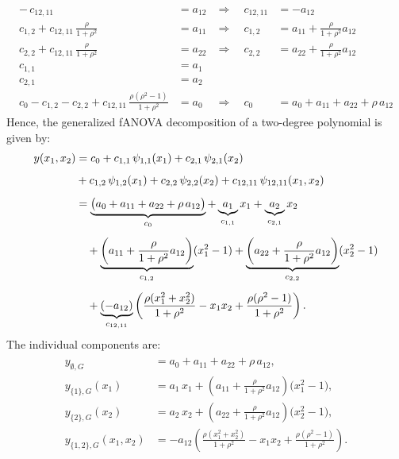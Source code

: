 \begin{align*}
-\,c_{12, 11} &= a_{12} &\Rightarrow\quad c_{12, 11} &= -a_{12} \\[0.5em]
c_{1,2} + c_{12, 11}\,\tfrac{\rho}{1+\rho^2} &= a_{11} 
&\Rightarrow\quad c_{1,2} &= a_{11} + \tfrac{\rho}{1+\rho^2}a_{12} \\[0.5em]
c_{2,2} + c_{12, 11}\,\tfrac{\rho}{1+\rho^2} &= a_{22} 
&\Rightarrow\quad c_{2,2} &= a_{22} + \tfrac{\rho}{1+\rho^2}a_{12} \\[0.5em]
c_{1,1} &= a_1 \\[0.5em]
c_{2,1} &= a_2 \\[0.5em]
c_0 - c_{1,2} - c_{2,2} + c_{12, 11}\,\tfrac{\rho(\rho^2 - 1)}{1+\rho^2} &= a_0 
&\Rightarrow\quad 
c_0 &= a_0 + a_{11} + a_{22} + \rho\,a_{12}
\end{align*}
Hence, the generalized fANOVA decomposition of a two-degree polynomial is given by:
\begin{align*}
y(x_1,x_2) 
&= c_0 
  + c_{1,1}\,\psi_{1,1}(x_1) 
  + c_{2,1}\,\psi_{2,1}(x_2) \\[0.5em]
&+ c_{1,2}\,\psi_{1,2}(x_1)
  + c_{2,2}\,\psi_{2,2}(x_2)
  + c_{12,11}\,\psi_{12,11}(x_1,x_2) \\[0.5em]
&= 
\underbrace{\big(a_0 + a_{11} + a_{22} + \rho\,a_{12}\big)}_{c_0} 
+ \underbrace{a_1}_{c_{1,1}} x_1
+ \underbrace{a_2}_{c_{2,1}} x_2 \\[0.5em]
&\quad 
+ \underbrace{\left(a_{11} + \frac{\rho}{1+\rho^2}a_{12}\right)}_{c_{1,2}} (x_1^2 - 1)
+ \underbrace{\left(a_{22} + \frac{\rho}{1+\rho^2}a_{12}\right)}_{c_{2,2}} (x_2^2 - 1) \notag \\[0.5em]
&\quad 
+ \underbrace{(-a_{12})}_{c_{12, 11}}\left(
    \frac{\rho(x_1^2+x_2^2)}{1+\rho^2} - x_1 x_2 
    + \frac{\rho(\rho^2-1)}{1+\rho^2}
  \right).
\end{align*}
The individual components are:
\begin{align}
\begin{split}
y_{\emptyset, G} &= a_0 + a_{11} + a_{22} + \rho\,a_{12}, \\[0.5em]
y_{\{1\}, G}(x_1) &= a_1\,x_1 
  + \left(a_{11} + \frac{\rho}{1+\rho^2}a_{12}\right)\bigl(x_1^2 - 1\bigr), \\[0.5em]
y_{\{2\}, G}(x_2) &= a_2\,x_2 
  + \left(a_{22} + \frac{\rho}{1+\rho^2}a_{12}\right)\bigl(x_2^2 - 1\bigr), \\[0.5em]
y_{\{1,2\}, G}(x_1,x_2) 
&= -a_{12}\!\left(
    \frac{\rho(x_1^2+x_2^2)}{1+\rho^2} 
    - x_1 x_2 
    + \frac{\rho(\rho^2-1)}{1+\rho^2}
   \right).
\end{split}
\label{eq:fanova_components_2D_polynomial}
\end{align}
